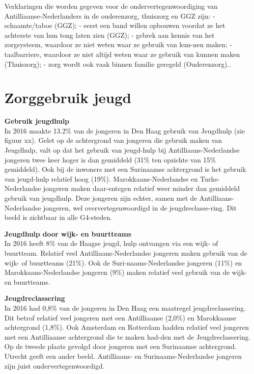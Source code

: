 \documentclass[]{book}
\begin{document}
Verklaringen die worden gegeven voor de ondervertegenwoordiging van
Antilliaanse-Nederlanders in de ouderenzorg, thuiszorg en GGZ zijn: -
schaamte/taboe (GGZ); - eerst een band willen opbouwen voordat ze het
achterste van hun tong laten zien (GGZ); - gebrek aan kennis van het
zorgsysteem, waardoor ze niet weten waar ze gebruik van kun-nen maken; -
taalbarriere, waardoor ze niet altijd weten waar ze gebruik van kunnen
maken (Thuiszorg); - zorg wordt ook vaak binnen familie geregeld
(Ouderenzorg).\citep{Hamdi2017}.

\hypertarget{zorggebruik-jeugd}{%
\chapter*{Zorggebruik jeugd}\label{zorggebruik-jeugd}}

\textbf{Gebruik jeugdhulp}\\
In 2016 maakte 13.2\% van de jongeren in Den Haag gebruik van Jeugdhulp
(zie figuur xx). Gelet op de achtergrond van jongeren die gebruik maken
van Jeugdhulp, valt op dat het gebruik van jeugd-hulp bij
Antilliaans-Nederlandse jongeren twee keer hoger is dan gemiddeld (31\%
ten opzichte van 15\% gemiddeld). Ook bij de inwoners met een Surinaamse
achtergrond is het gebruik van jeugd-hulp relatief hoog (19\%).
Marokkaans-Nederlandse en Turks-Nederlandse jongeren maken daar-entegen
relatief weer minder dan gemiddeld gebruik van jeugdhulp. Deze jongeren
zijn echter, samen met de Antilliaans-Nederlandse jongeren, wel
oververtegenwoordigd in de jeugdreclasse-ring. Dit beeld is zichtbaar in
alle G4-steden.

\textbf{Jeugdhulp door wijk- en buurtteams}\\
In 2016 heeft 8\% van de Haagse jeugd, hulp ontvangen via een wijk- of
buurtteam. Relatief veel Antilliaans-Nederlandse jongeren maken gebruik
van de wijk- of buurtteams (21\%). Ook de Suri-naams-Nederlandse
jongeren (11\%) en Marokkaans-Nederlandse jongeren (9\%) maken relatief
veel gebruik van de wijk- en buurtteams.

\textbf{Jeugdreclassering}\\
In 2016 had 0,8\% van de jongeren in Den Haag een maatregel
jeugdreclassering. Dit betrof relatief veel jongeren met een
Antilliaanse (2,0\%) en Marokkaanse achtergrond (1,8\%). Ook Amsterdam
en Rotterdam hadden relatief veel jongeren met een Antilliaanse
achtergrond die te maken had-den met de Jeugdreclassering. Op de tweede
plaats gevolgd door jongeren met een Surinaamse achtergrond. Utrecht
geeft een ander beeld. Antilliaans- en Surinaams-Nederlandse jongeren
zijn juist ondervertegenwoordigd.
\end{document}
